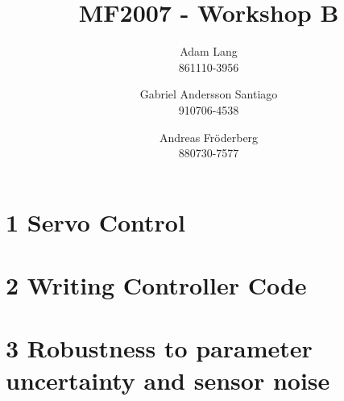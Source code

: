 \documentclass[12pt,a4paper]{article}
\title{MF2007 - Workshop B}
\author{
Adam Lang \\ 861110-3956
\and
Gabriel Andersson Santiago \\ 910706-4538
\and 
Andreas Fr\"oderberg \\ 880730-7577
}
\begin{document}
\maketitle
\section*{1 Servo Control}
  
\section*{2 Writing Controller Code}
  
\section*{3 Robustness to parameter uncertainty and sensor noise}
  
  
\end{document}
